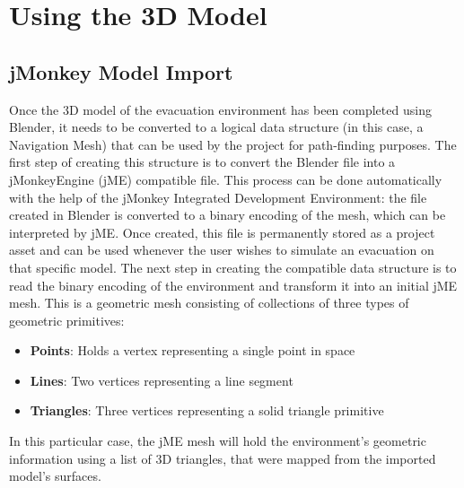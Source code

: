 \documentclass[a4paper,11pt]{article}
\title{}
\author{}
\begin{document}
\section{Using the 3D Model}
\subsection{jMonkey Model Import}
Once the 3D model of the evacuation environment has been completed using Blender, it needs to be converted to a logical data structure (in this case, a Navigation Mesh) that can be used by the project for path-finding purposes. The first step of creating this structure is to convert the Blender file into a jMonkeyEngine (jME) compatible file. This process can be done automatically with the help of the jMonkey Integrated Development Environment: the file created in Blender is converted to a binary encoding of the mesh, which can be interpreted by jME. Once created, this file is permanently stored as a project asset and can be used whenever the user wishes to simulate an evacuation on that specific model.
The next step in creating the compatible data structure is to read the binary encoding of the environment and transform it into an initial jME mesh. This is a geometric mesh consisting of collections of three types of geometric primitives:
\begin{itemize}
  \item\textbf{Points}: Holds a vertex representing a single point in space
  \item\textbf{Lines}: Two vertices representing a line segment
  \item\textbf{Triangles}: Three vertices representing a solid triangle primitive
\end{itemize}
In this particular case, the jME mesh will hold the environment's geometric information using a list of 3D triangles, that were mapped from the imported model's surfaces.
\end{document}
